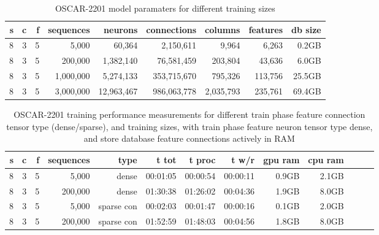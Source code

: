 \begin{table}[H]
\centering
\caption{OSCAR-2201 model paramaters for different training sizes}
\label{tab:oscar-performance-param}
\begin{tabular}{rrrrrrrrr}
\toprule
\textbf{s} & \textbf{c} & \textbf{f} & \textbf{sequences} & \textbf{neurons} & \textbf{connections} & \textbf{columns} & \textbf{features} & \textbf{db size} \\
\midrule
8 & 3 & 5 & 5,000       & 60,364 & 2,150,611 & 9,964 & 6,263 & 0.2GB \\
8 & 3 & 5 & 200,000     & 1,382,140 & 76,581,459 & 203,804 & 43,636 & 6.0GB \\
8 & 3 & 5 & 1,000,000   & 5,274,133 & 353,715,670 & 795,326 & 113,756 & 25.5GB \\
8 & 3 & 5 & 3,000,000   & 12,963,467 & 986,063,778 & 2,035,793 & 235,761 & 69.4GB \\
\bottomrule
\end{tabular}
\end{table}

\begin{table}[H]
\centering
\caption{OSCAR-2201 training performance measurements for different train phase feature connection tensor type (dense/sparse), and training sizes, with train phase feature neuron tensor type dense, and store database feature connections actively in RAM}
\label{tab:oscar-performance-trainSparseConnectionsTensor}
\begin{tabular}{rrrrrrrrrrrrr}
\toprule
\textbf{s} & \textbf{c} & \textbf{f} & \textbf{sequences} & \textbf{type} & \textbf{t tot} & \textbf{t proc} & \textbf{t w/r} & \textbf{gpu ram} & \textbf{cpu ram} \\
\midrule
8 & 3 & 5 & 5,000       & dense & 00:01:05 & 00:00:54 & 00:00:11 & 0.9GB & 2.1GB \\
8 & 3 & 5 & 200,000     & dense & 01:30:38 & 01:26:02 & 00:04:36 & 1.9GB & 8.0GB \\
8 & 3 & 5 & 5,000       & sparse con & 00:02:03 & 00:01:47 & 00:00:16 & 0.1GB & 2.0GB \\
8 & 3 & 5 & 200,000     & sparse con & 01:52:59 & 01:48:03 & 00:04:56 & 1.8GB & 8.0GB \\
\bottomrule
\end{tabular}
\end{table}

